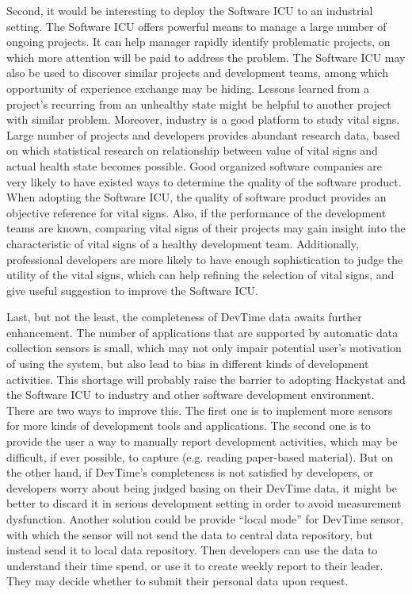 Second, it would be interesting to deploy the Software ICU to an industrial setting. The Software ICU offers powerful means to manage a large number of ongoing projects. It can help manager rapidly identify problematic projects, on which more attention will be paid to address the problem. The Software ICU may also be used to discover similar projects and development teams, among which opportunity of experience exchange may be hiding. Lessons learned from a project's recurring from an unhealthy state might be helpful to another project with similar problem. Moreover, industry is a good platform to study vital signs. Large number of projects and developers provides abundant research data, based on which statistical research on relationship between value of vital signs and actual health state becomes possible. Good organized software companies are very likely to have existed ways to determine the quality of the software product. When adopting the Software ICU, the quality of software product provides an objective reference for vital signs. Also, if the performance of the development teams are known, comparing vital signs of their projects may gain insight into the characteristic of vital signs of a healthy development team. Additionally, professional developers are more likely to have enough sophistication to judge the utility of the vital signs, which can help refining the selection of vital signs, and give useful suggestion to improve the Software ICU.
 
 
Last, but not the least, the completeness of DevTime data awaits further enhancement. The number of applications that are supported by automatic data collection sensors is small, which may not only impair potential user's motivation of using the system, but also lead to bias in different kinds of development activities. This shortage will probably raise the barrier to adopting Hackystat and the Software ICU to industry and other software development environment. There are two ways to improve this. The first one is to implement more sensors for more kinds of development tools and applications. The second one is to provide the user a way to manually report development activities, which may be difficult, if ever possible, to capture (e.g. reading paper-based material). But on the other hand, if DevTime's completeness is not satisfied by developers, or developers worry about being judged basing on their DevTime data, it might be better to discard it in serious development setting in order to avoid measurement dysfunction. Another solution could be provide ``local mode'' for DevTime sensor, with which the sensor will not send the data to central data repository, but instead send it to local data repository. Then developers can use the data to understand their time spend, or use it to create weekly report to their leader. They may decide whether to submit their personal data upon request.


